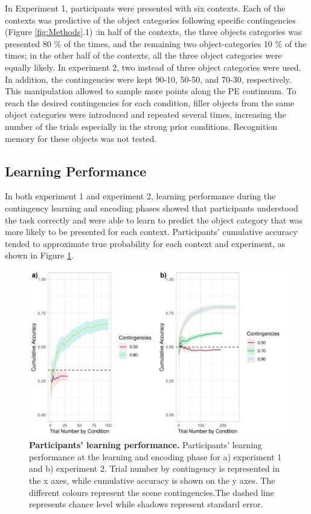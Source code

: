 \documentclass[a4paper,12pt]{article}
\begin{document}
In Experiment 1, participants were presented with six contexts. Each of the contexts was predictive of the object categories following specific contingencies (Figure \ref{fig:Methods}.1) :in half of the contexts, the three objects categories was presented 80 \% of the times, and the remaining two object-categories 10 \% of the times; in the other half of the contexts, all the three object categories were equally likely. In experiment 2, two instead of three object categories were used. In addition, the contingencies were kept 90-10, 50-50, and 70-30, respectively. This manipulation allowed to sample more points along the PE continuum. To reach the desired contingencies for each condition, filler objects from the same object categories were introduced and repeated several times, increasing the number of the trials especially in the strong prior conditions. Recognition memory for these objects was not tested.

\subsection{Learning Performance}
In both experiment 1 and experiment 2, learning performance during the contingency learning and encoding phases showed that participants understood the task correctly and were able to learn to predict the object category that was more likely to be presented for each context. Participants’ cumulative accuracy tended to approximate true probability for each context and experiment, as shown in Figure \ref{fig:participantsLer}.



\begin{figure}[ht!]
\centerline
{\includegraphics[width=1\textwidth]{figures/cumAccbySceneAll.jpg}}
\caption{\textbf{Participants' learning performance.} Participants' learning performance at the learning and encoding phase for a) experiment 1 and b) experiment 2. Trial number by contingency is represented in the x axes, while cumulative accuracy is shown on the y axes. The different colours represent the scene contingencies.The dashed line represents chance level while shadows represent standard error.}
\label{fig:participantsLer}
\end{figure}
\end{document}
